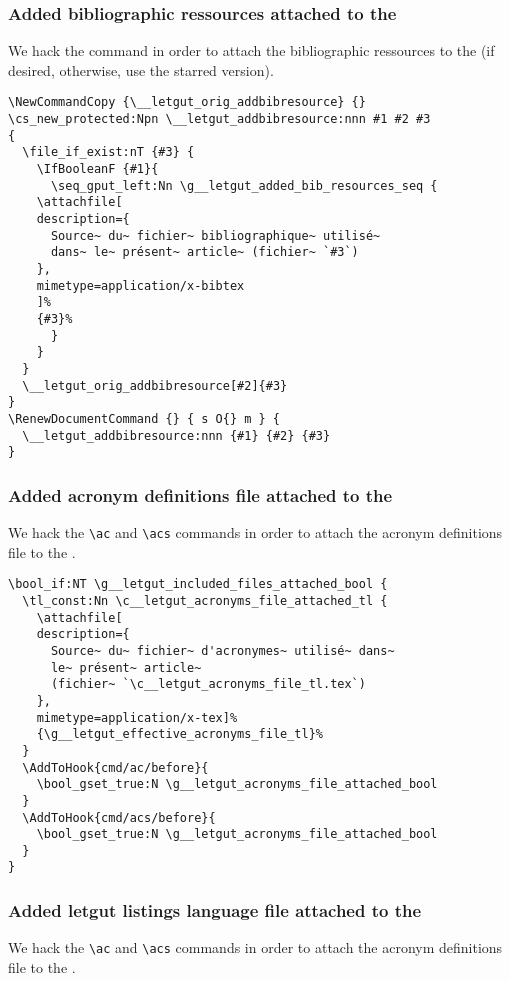 \documentclass{letgut}
\begin{document}
\subsubsection{Added bibliographic ressources attached to the \pdf}
\label{ImplementationMiscellanousAddedbibliographicressourcesattachedtothe\pdf-l4e34ja00pj0}
We hack the \lstinline++ command in order to attach the bibliographic
ressources to the \pdf{} (if desired, otherwise, use the starred version).

\begin{lstlisting}
\NewCommandCopy {\__letgut_orig_addbibresource} {}
\cs_new_protected:Npn \__letgut_addbibresource:nnn #1 #2 #3
{
  \file_if_exist:nT {#3} {
    \IfBooleanF {#1}{
      \seq_gput_left:Nn \g__letgut_added_bib_resources_seq {
	\attachfile[
	description={
	  Source~ du~ fichier~ bibliographique~ utilisé~
	  dans~ le~ présent~ article~ (fichier~ `#3`)
	},
	mimetype=application/x-bibtex
	]%
	{#3}%
      }
    }
  }
  \__letgut_orig_addbibresource[#2]{#3}
}
\RenewDocumentCommand {} { s O{} m } {
  \__letgut_addbibresource:nnn {#1} {#2} {#3}
}
\end{lstlisting}

\subsubsection{Added acronym definitions file attached to the \pdf}
\label{ImplementationMiscellanousAddedbibliographicressourcesattachedtothe\pdf-l4e34ja00pj0}
We hack the \lstinline+\ac+ and \lstinline+\acs+ commands in order to attach the acronym definitions
file to the \pdf{}.

\begin{lstlisting}
\bool_if:NT \g__letgut_included_files_attached_bool {
  \tl_const:Nn \c__letgut_acronyms_file_attached_tl {
    \attachfile[
    description={
      Source~ du~ fichier~ d'acronymes~ utilisé~ dans~
      le~ présent~ article~
      (fichier~ `\c__letgut_acronyms_file_tl.tex`)
    },
    mimetype=application/x-tex]%
    {\g__letgut_effective_acronyms_file_tl}%
  }
  \AddToHook{cmd/ac/before}{
    \bool_gset_true:N \g__letgut_acronyms_file_attached_bool
  }
  \AddToHook{cmd/acs/before}{
    \bool_gset_true:N \g__letgut_acronyms_file_attached_bool
  }
}
\end{lstlisting}

\subsubsection{Added letgut listings language file attached to the \pdf}
\label{ImplementationMiscellanousAddedbibliographicressourcesattachedtothe\pdf-l4e34ja00pj0}
We hack the \lstinline+\ac+ and \lstinline+\acs+ commands in order to attach the acronym definitions
file to the \pdf{}.
\end{document}
